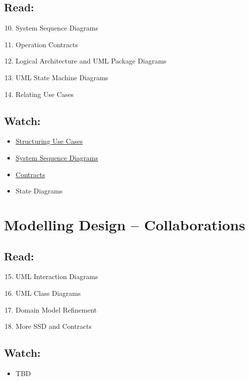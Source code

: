 \documentclass[10pt,t,a4paper]{article}
\begin{document}
\subsection{Read:}
\label{sec-5-1}
\begin{enumerate}
\setcounter{enumi}{9}
\item System Sequence Diagrams
\item Operation Contracts
\setcounter{enumi}{12}
\item Logical Architecture and UML Package Diagrams
\setcounter{enumi}{28}
\item UML State Machine Diagrams
\item Relating Use Cases
\end{enumerate}

\subsection{Watch:}
\label{sec-5-2}
\begin{itemize}
\item \href{https://play.bth.se/media/Structuring+Use+Cases/1_seaeffad/41750261}{Structuring Use Cases}
\item \href{https://play.bth.se/media/SystemSequenceDiagrams.mp4/1_99i0cfv7/41750261}{System Sequence Diagrams}
\item \href{https://play.bth.se/media/Contracts/1_086yu2lr/41750261}{Contracts}
\item State Diagrams
\end{itemize}
\section{Modelling Design -- Collaborations}
\label{sec-6}
\subsection{Read:}
\label{sec-6-1}
\begin{enumerate}
\setcounter{enumi}{14}
\item UML Interaction Diagrams
\item UML Class Diagrams
\setcounter{enumi}{30}
\item Domain Model Refinement
\item More SSD and Contracts
\end{enumerate}

\subsection{Watch:}
\label{sec-6-2}
\begin{itemize}
\item TBD
\end{itemize}
\end{document}
